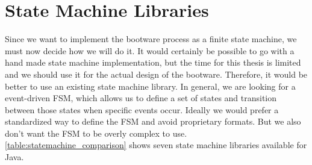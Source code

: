 \section{State Machine Libraries}
\label{implementation:selecting:statemachine}

Since we want to implement the bootware process as a finite state machine, we must now decide how we will do it.
It would certainly be possible to go with a hand made state machine implementation, but the time for this thesis is limited and we should use it for the actual design of the bootware.
Therefore, it would be better to use an existing state machine library.
In general, we are looking for a event-driven FSM, which allows us to define a set of states and transition between those states when specific events occur.
Ideally we would prefer a standardized way to define the FSM and avoid proprietary formats.
But we also don't want the FSM to be overly complex to use.
\autoref{table:statemachine_comparison} shows seven state machine libraries available for Java.

